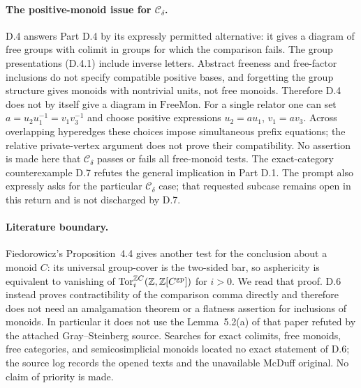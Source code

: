 \paragraph{The positive-monoid issue for $\mathcal C_\delta$.}
D.4 answers Part D.4 by its expressly permitted alternative:
it gives a diagram of free groups with colimit in groups for
which the comparison fails. The group presentations (D.4.1)
include inverse letters. Abstract freeness and free-factor
inclusions do not specify compatible positive bases, and
forgetting the group structure gives monoids with nontrivial
units, not free monoids. Therefore D.4 does not by itself
give a diagram in $\mathrm{FreeMon}$. For a single relator one
can set $a=u_2u_1^{-1}=v_1v_3^{-1}$ and choose positive
expressions $u_2=au_1$, $v_1=av_3$. Across overlapping
hyperedges these choices impose simultaneous prefix equations;
the relative private-vertex argument does not prove their
compatibility. No assertion is made here that
$\mathcal C_\delta$ passes or fails all free-monoid tests.
The exact-category counterexample D.7 refutes the general
implication in Part D.1. The prompt also expressly asks for
the particular $\mathcal C_\delta$ case; that requested subcase
remains open in this return and is not discharged by D.7.


\paragraph{Literature boundary.}
Fiedorowicz's Proposition~4.4 \cite{CDFiedorowicz1984} gives
another test for the conclusion about a monoid $C$: its
universal group-cover is the two-sided bar, so asphericity is
equivalent to vanishing of
$\operatorname{Tor}_i^{\mathbb Z C}(\mathbb Z,\mathbb Z[C^{\mathrm{gp}}])$ for $i>0$.
We read that proof. D.6 instead proves contractibility of the
comparison comma directly and therefore does not need an
amalgamation theorem or a flatness assertion for inclusions of
monoids. In particular it does not use the Lemma~5.2(a) of that
paper refuted by the attached Gray--Steinberg source. Searches
for exact colimits, free monoids, free categories, and
semicosimplicial monoids located no exact statement of D.6;
the source log records the opened texts and the unavailable
McDuff original. No claim of priority is made.
